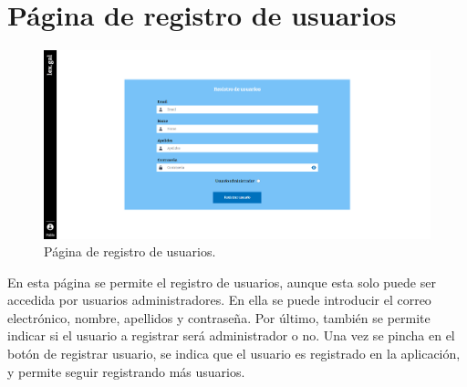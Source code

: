 \section{Página de registro de usuarios}
\label{PRegistroUsuarios}

\begin{figure}[H]
\centerline{\includegraphics[width=15cm]{figuras/manualUsuario/RegistroUsuario.PNG}}
\caption{Página de registro de usuarios.}
\label{enlacePRegistroUsuarios}
\end{figure}

En esta página se permite el registro de usuarios, aunque esta solo puede ser accedida por usuarios administradores. En ella se puede introducir el correo electrónico, nombre, apellidos y contraseña. Por último, también se permite indicar si el usuario a registrar será administrador o no. Una vez se pincha en el botón de registrar usuario, se indica que el usuario es registrado en la aplicación, y permite seguir registrando más usuarios.
